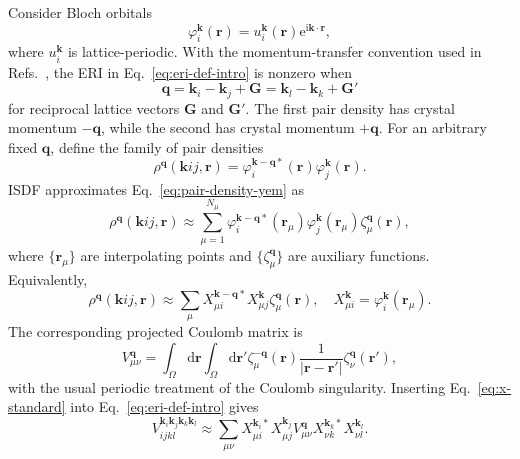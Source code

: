 \documentclass[aps,prb,reprint,superscriptaddress,longbibliography,nofootinbib]{revtex4-2}
\newcommand{\br}{\mathbf r}
\newcommand{\bG}{\mathbf G}
\newcommand{\bk}{\mathbf k}
\newcommand{\bq}{\mathbf q}
\newcommand{\dd}{\mathrm d}
\newcommand{\ee}{\mathrm e}
\newcommand{\ii}{\mathrm i}
\newcommand{\cell}{\Omega}
\begin{document}
Consider Bloch orbitals
\begin{equation}
\varphi_i^{\bk}(\br)=u_i^{\bk}(\br)\ee^{\ii\bk\cdot\br},
\label{eq:bloch}
\end{equation}
where \(u_i^{\bk}\) is lattice-periodic.  With the momentum-transfer convention used in Refs.~, the ERI in Eq.~\eqref{eq:eri-def-intro} is nonzero when
\begin{equation}
\bq=\bk_i-\bk_j+\bG=\bk_l-\bk_k+\bG'
\label{eq:q-convention}
\end{equation}
for reciprocal lattice vectors \(\bG\) and \(\bG'\).  The first pair density has crystal momentum \(-\bq\), while the second has crystal momentum \(+\bq\).  For an arbitrary fixed \(\bq\), define the family of pair densities
\begin{equation}
\rho^{\bq}(\bk ij,\br)
=
\varphi_i^{\bk-\bq *}(\br)\varphi_j^{\bk}(\br).
\label{eq:pair-density-yem}
\end{equation}
ISDF approximates Eq.~\eqref{eq:pair-density-yem} as
\begin{equation}
\rho^{\bq}(\bk ij,\br)
\approx
\sum_{\mu=1}^{N_\mu}
\varphi_i^{\bk-\bq *}(\br_\mu)\varphi_j^{\bk}(\br_\mu)
\zeta_\mu^{\bq}(\br),
\label{eq:isdf-standard}
\end{equation}
where \(\{\br_\mu\}\) are interpolating points and \(\{\zeta_\mu^{\bq}\}\) are auxiliary functions.  Equivalently,
\begin{equation}
\rho^{\bq}(\bk ij,\br)
\approx
\sum_\mu X_{\mu i}^{\bk-\bq *}X_{\mu j}^{\bk}\zeta_\mu^{\bq}(\br),
\quad
X_{\mu i}^{\bk}=\varphi_i^{\bk}(\br_\mu).
\label{eq:x-standard}
\end{equation}
The corresponding projected Coulomb matrix is
\begin{equation}
V_{\mu\nu}^{\bq}
=
\int_{\cell}\dd\br\int_{\cell}\dd\br'
\zeta_\mu^{-\bq}(\br)
\frac{1}{|\br-\br'|}
\zeta_\nu^{\bq}(\br'),
\label{eq:vmunu-standard}
\end{equation}
with the usual periodic treatment of the Coulomb singularity.  Inserting Eq.~\eqref{eq:x-standard} into Eq.~\eqref{eq:eri-def-intro} gives
\begin{equation}
V_{ijkl}^{\bk_i\bk_j\bk_k\bk_l}
\approx
\sum_{\mu\nu}
X_{\mu i}^{\bk_i *}X_{\mu j}^{\bk_j}
V_{\mu\nu}^{\bq}
X_{\nu k}^{\bk_k *}X_{\nu l}^{\bk_l}.
\label{eq:thc-standard}
\end{equation}
\end{document}

